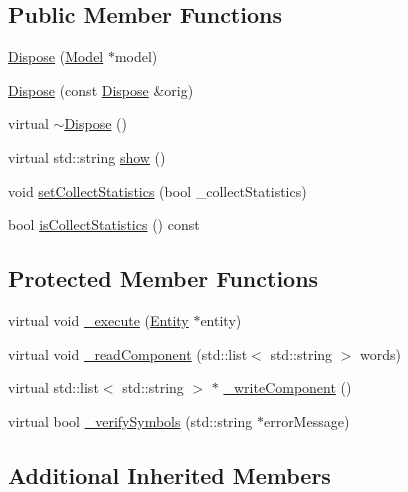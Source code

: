 \subsection*{Public Member Functions}
\begin{DoxyCompactItemize}
\item 
\hyperlink{class_dispose_a9b5ccd61252e7f36d747fd832debdfaa}{Dispose} (\hyperlink{class_model}{Model} $\ast$model)
\item 
\hyperlink{class_dispose_a8d4515962baf1fd7c01912cb654aa683}{Dispose} (const \hyperlink{class_dispose}{Dispose} \&orig)
\item 
virtual \hyperlink{class_dispose_a2a2af23e9cbca66b02a142252a99096d}{$\sim$\-Dispose} ()
\item 
virtual std\-::string \hyperlink{class_dispose_aee8ef98d5ca22eb18a97b258ed059865}{show} ()
\item 
void \hyperlink{class_dispose_a8dc978664e640bc4d58760770b84b84e}{set\-Collect\-Statistics} (bool \-\_\-collect\-Statistics)
\item 
bool \hyperlink{class_dispose_aff15fbea8737b30efe9b3521d12350bd}{is\-Collect\-Statistics} () const 
\end{DoxyCompactItemize}
\subsection*{Protected Member Functions}
\begin{DoxyCompactItemize}
\item 
virtual void \hyperlink{class_dispose_a342eb428496534cdfd17524ad78b0c08}{\-\_\-execute} (\hyperlink{class_entity}{Entity} $\ast$entity)
\item 
virtual void \hyperlink{class_dispose_a2016b0e90d850753181417648557e3ce}{\-\_\-read\-Component} (std\-::list$<$ std\-::string $>$ words)
\item 
virtual std\-::list$<$ std\-::string $>$ $\ast$ \hyperlink{class_dispose_a2483f126094c4f58a2873ec7083a1903}{\-\_\-write\-Component} ()
\item 
virtual bool \hyperlink{class_dispose_a5ad64b97bbb16662aa9d914eda2a7e38}{\-\_\-verify\-Symbols} (std\-::string $\ast$error\-Message)
\end{DoxyCompactItemize}
\subsection*{Additional Inherited Members}


